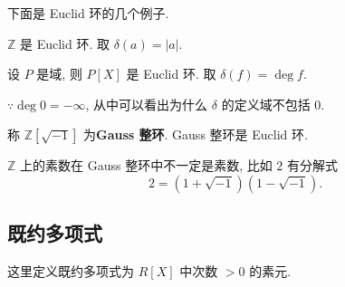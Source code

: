 \documentclass[color=black,device=normal,lang=cn,mode=geye]{elegantnote}
\begin{document}
下面是 Euclid 环的几个例子.
\begin{example}
    $\mathbb{Z}$ 是 Euclid 环. 取 $\delta(a)=|a|$.
\end{example}
\begin{example}
    设 $P$ 是域, 则 $P[X]$ 是 Euclid 环. 取 $\delta(f)=\deg f$.

    $\because\deg 0=-\infty$, 从中可以看出为什么 $\delta$ 的定义域不包括 $0$.
\end{example}
\begin{example}
    称 $\mathbb{Z}[\sqrt{-1}]$ 为\textbf{Gauss 整环}. Gauss 整环是 Euclid 环.

    $\mathbb{Z}$ 上的素数在 Gauss 整环中不一定是素数, 比如 $2$ 有分解式
    \[2=(1+\sqrt{-1})(1-\sqrt{-1}).\]
\end{example}
\subsection{既约多项式}
这里定义既约多项式为 $R[X]$ 中次数 $>0$ 的素元.
\end{document}

